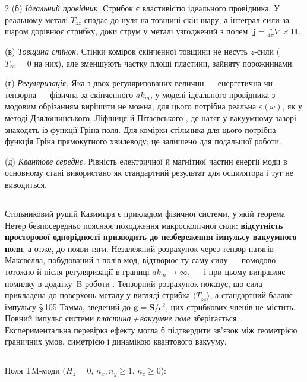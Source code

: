 \documentclass[twoside, 10pt]{article}
\def\myvspacebeforesubsection{-2.0mm}
\def\myvspaceaftersubsection{-2.5mm}
\begin{document}
\begin{multicols}{2}
(б) \textit{Ідеальний провідник.} Стрибок є властивістю ідеального провідника. У реальному металі
\(T_{zz}\) спадає до нуля на товщині скін-шару, а інтеграл сили за шаром дорівнює стрибку, доки
струм у металі узгоджений з полем: \(\mathbf j=\frac c{4\pi}\nabla\times\mathbf H\).

(в) \textit{Товщина стінок.} Стінки комірок скінченної товщини не несуть \(z\)-сили (\(T_{zx}=0\)
на них), але зменшують частку площі пластини, зайняту порожнинами.

(г) \textit{Регуляризація.} Яка з двох регуляризованих величин --- енергетична чи тензорна ---
фізична за скінченного \(ak_m\), у моделі ідеального провідника з модовим обрізанням вирішити не
можна; для цього потрібна реальна \(\varepsilon(\omega)\), як у методі Дзялошинського, Ліфшиця й
Пітаєвського \cite{DLP1961}, де натяг у вакуумному зазорі знаходять із функції Гріна поля. Для
комірки стільника для цього потрібна функція Гріна прямокутного хвилеводу; це залишено для
подальшої роботи.

(д) \textit{Квантове середнє.} Рівність електричної й магнітної частин енергії моди в основному
стані використано як стандартний результат для осцилятора і тут не виводиться.

\vspace{\myvspacebeforesubsection}
\subsection*{}
\vspace{\myvspaceaftersubsection}


Стільниковий рушій Казимира є прикладом фізичної системи, у якій теорема Нетер безпосередньо
пояснює походження макроскопічної сили: \textbf{відсутність просторової однорідності призводить до
незбереження імпульсу вакуумного поля}, а отже, до появи тяги. Незалежний розрахунок через тензор натягів
Максвелла, побудований з полів мод, відтворює ту саму силу --- помодово тотожно й після
регуляризації в границі \(ak_m\to\infty\), --- і при цьому виправляє помилку в додатку~B роботи
\cite{Drozdov2024}. Тензорний розрахунок показує, що сила прикладена до поверхонь металу у вигляді
стрибка \(\langle T_{zz}\rangle\), а стандартний баланс імпульсу \S\,105 Тамма, зведений до
\(\mathbf g=\mathbf S/c^2\), цих стрибкових членів не містить. Повний імпульс системи
\emph{пластина\,+\,вакуумне поле} зберігається. Експериментальна перевірка ефекту могла б
підтвердити зв'язок між геометрією граничних умов, симетрією і динамікою квантового вакууму.

\vspace{\myvspacebeforesubsection}
\subsection*{}
\vspace{\myvspaceaftersubsection}


Поля TM-моди (\(H_z=0\), \(n_x,n_y\ge1\), \(n_z\ge0\)):
\end{multicols}
\end{document}
